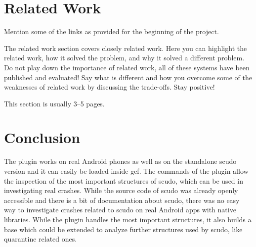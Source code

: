 \documentclass[a4paper,11pt,oneside]{report}
\begin{document}
\chapter{Related Work}


Mention some of the links as provided for the beginning of the project.

The related work section covers closely related work. Here you can highlight
the related work, how it solved the problem, and why it solved a different
problem. Do not play down the importance of related work, all of these
systems have been published and evaluated! Say what is different and how
you overcome some of the weaknesses of related work by discussing the 
trade-offs. Stay positive!

This section is usually 3–5 pages.


\chapter{Conclusion}

The plugin works on real Android phones as well as on the standalone scudo
version and it can easily be loaded inside gef. The commands of the plugin
allow the inspection of the most important structures of scudo, which can
be used in investigating real crashes. While the source code of scudo was
already openly accessible and there is a bit of documentation
about scudo, there was no easy way to investigate crashes  
related to scudo on
real Android apps with native libraries. While the plugin handles the most
important structures, it also builds a base which could be extended to
analyze further structures used by scudo, like quarantine related ones.

\cleardoublepage{}
\printbibliography{}

%
%
\end{document}
